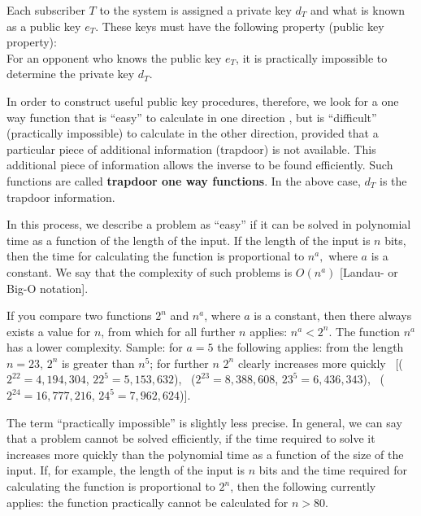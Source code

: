 Each subscriber $ T $ to the system is assigned a private  
 key $ d_T $   and what is known as a public key $ e_T $. 
These keys must have the following property (public key property):\\
For an opponent who knows the public key $ e_T $, it is practically impossible 
to determine the private key  $ d_T $.\par

In order to construct useful public key procedures, therefore, we look for a 
one way function that is ``easy'' to calculate in one direction {}, but 
is ``difficult'' (practically impossible) to calculate in the other 
direction, provided that a particular piece of additional information 
 (trapdoor) is not available. This 
additional piece of information allows the inverse to be found efficiently. Such 
functions are called {\bf trapdoor one way functions}. In the above case, $ d_T 
$ is the trapdoor information. \par

In this process, we describe a problem as ``easy'' if it can be solved in 
 polynomial time as a function of the length of the 
input. If the length of the input is $ n $ bits, then the time for calculating 
the function is proportional to $ n^{a}, $ where $ a $  is a constant. We say 
that the  complexity of such problems is $ O(n^{a}) $
[Landau- or Big-O notation]. 

If you compare two functions  $ 2^n $  and   $ n^{a} $,  where $ a $  is a
constant, then there always exists a value for  $ n $,  from which for all
further  $ n $  applies: $ n^{a}  <  2^n $. 
The function  $ n^{a} $  has a lower complexity.    
Sample: for $ a=5 $ the following applies: from the length $ n=23 $, $ 2^n$
is greater than $n^5 $; for further $ n $  $ 2^n $ clearly increases more
quickly \
[($ 2^{22}= 4,194,304 $, $ 22^5= 5,153,632 $), \
 ($ 2^{23}= 8,388,608 $, $ 23^5= 6,436,343 $), \
 ($ 2^{24}=16,777,216 $, $ 24^5= 7,962,624 $)].\par 

The term ``practically impossible'' is slightly less precise. In 
general, we can say that a problem cannot be solved  
efficiently, if the time required to solve it increases more quickly than the 
polynomial \index{Polynomial }time as a function of the size of the input. If, for example, the 
length of the input is $ n $  bits and the time required for calculating the 
function is proportional to $ 2^n $, then the following currently applies: the 
function practically cannot be calculated for $n > 80$.

